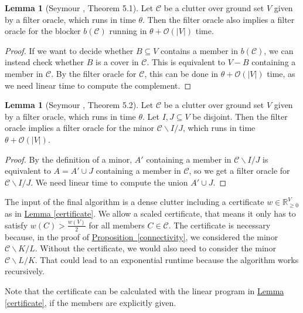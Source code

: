 \documentclass[a4paper, 12pt]{scrbook}
\theoremstyle{definition}
\newtheorem{lemma}[theorem]{Lemma}
\newcommand*{\IR}{\ensuremath{\mathbb{R}}}
\begin{document}
   \begin{lemma}[Seymour \cite{seymour}, Theorem 5.1]
       Let $\mathcal{C}$ be a clutter over ground set $V$ given by a filter oracle, which runs in time $\theta$.
       Then the filter oracle also implies a filter oracle for the blocker $b(\mathcal{C})$ running in $\theta+\mathcal{O}(|V|)$ time.
   \end{lemma}

   \begin{proof}
       If we want to decide whether $B \subseteq V$ contains a member in $b(\mathcal{C})$, we can instead check whether $B$ is a cover in $\mathcal{C}$. This is equivalent to $V-B$ containing a member in $\mathcal{C}$. By the filter oracle for $\mathcal{C}$, this can be done in $\theta+\mathcal{O}(|V|)$ time, as we need linear time to compute the complement.
   \end{proof}

   \begin{lemma}[Seymour \cite{seymour}, Theorem 5.2]
       Let $\mathcal{C}$ be a clutter over ground set $V$ given by a filter oracle, which runs in time $\theta$. Let $I,J \subseteq V$ be disjoint.
       Then the filter oracle implies a filter oracle for the minor $\mathcal{C} \backslash I /J$, which runs in time $\theta+\mathcal{O}(|V|)$.
   \end{lemma}

   \begin{proof}
       By the definition of a minor, $A'$ containing a member in $\mathcal{C} \backslash I / J$ is equivalent to $A = A' \cup J$ containing a member in $\mathcal{C}$, so we get a filter oracle for $\mathcal{C} \backslash I / J$. We need linear time to compute the union $A' \cup J$.
   \end{proof}

   The input of the final algorithm is a dense clutter including a certificate $w \in \IR^V_{\geq 0}$ as in \hyperref[certificate]{Lemma \ref*{certificate}}. We allow a scaled certificate, that means it only has to satisfy $w(C) > \frac {w(V)}{2}$ for all members $C \in \mathcal{C}$. The certificate is necessary because, in the proof of \hyperref[connectivity]{Proposition~\ref*{connectivity}}, we considered the minor $\mathcal{C} \backslash K / L$. Without the certificate, we would also need to consider the minor $\mathcal{C}\backslash L / K$. That could lead to an exponential runtime because the algorithm works recursively.

   Note that the certificate can be calculated with the linear program in \hyperref[certificate]{Lemma \ref*{certificate}}, if the members are explicitly given.
\end{document}

